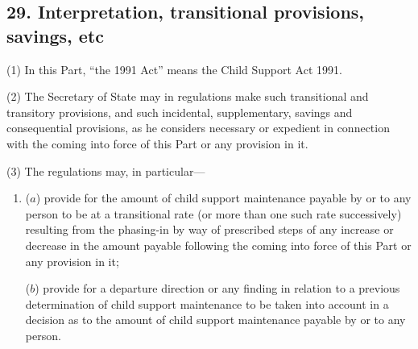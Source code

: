 \documentclass[12pt,a4paper]{article}
\begin{document}
%
%
%
%
%
%
%
%
%
%
%
%

\subsection{29. Interpretation, transitional provisions, savings, etc}

(1) In this Part, “the 1991 Act” means the Child Support Act 1991. 

(2) The Secretary of State may in regulations make such transitional and transitory provisions, and such incidental, supplementary, savings and consequential provisions, as he considers necessary or expedient in connection with the coming into force of this Part or any provision in it.

(3) The regulations may, in particular—
\begin{enumerate}\item[]
($a$) provide for the amount of child support maintenance payable by or to any person to be at a transitional rate (or more than one such rate successively) resulting from the phasing-in by way of prescribed steps of any increase or decrease in the amount payable following the coming into force of this Part or any provision in it;

($b$) provide for a departure direction or any finding in relation to a previous determination of child support maintenance to be taken into account in a decision as to the amount of child support maintenance payable by or to any person.
\end{enumerate}
\end{document}
